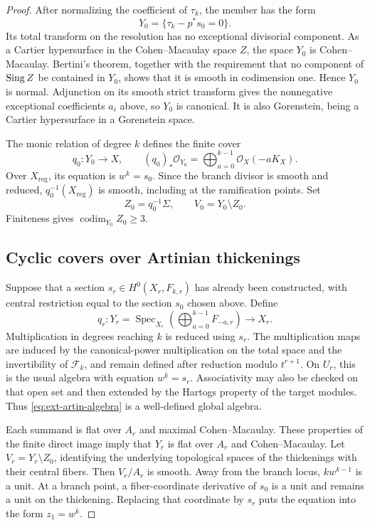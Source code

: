 \documentclass[11pt,a4paper]{article}
\theoremstyle{definition}\newtheorem{definition}[theorem]{Definition}
\theoremstyle{remark}\newtheorem*{remark}{Remark}
\newcommand{\OO}{\mathcal O}
\newcommand{\cF}{\mathcal F}\newcommand{\cX}{\mathcal X}
\newcommand{\Spec}{\operatorname{Spec}}\newcommand{\Proj}{\operatorname{Proj}}
\begin{document}
\begin{proof}
After normalizing the coefficient of $\tau_k$, the member has the form
\begin{equation}\label{eq:ext-central-root}
 Y_0=\{\tau_k-p^*s_0=0\}.
\end{equation}
Its total transform on the resolution has no exceptional divisorial
component. As a Cartier hypersurface in the Cohen--Macaulay space $Z$,
the space $Y_0$ is Cohen--Macaulay. Bertini's theorem, together with the
requirement that no component of $\operatorname{Sing} Z$ be contained in $Y_0$, shows
that it is smooth in codimension one. Hence $Y_0$ is normal.
Adjunction on its smooth strict transform gives the nonnegative
exceptional coefficients $a_i$ above, so $Y_0$ is canonical.
It is also Gorenstein, being a Cartier hypersurface in a Gorenstein space.

The monic relation of degree $k$ defines the finite cover
\begin{equation}\label{eq:ext-central-algebra}
 q_0:Y_0\to X,\qquad
 (q_0)_*\OO_{Y_0}
 =\bigoplus_{a=0}^{k-1}\OO_X(-aK_X).
\end{equation}
Over $X_{\mathrm{reg}}$, its equation is $w^k=s_0$.
Since the branch divisor is smooth and reduced,
$q_0^{-1}(X_{\mathrm{reg}})$ is smooth, including at the ramification
points. Set
\[
 Z_0=q_0^{-1}\Sigma,\qquad V_0=Y_0\setminus Z_0.
\]
Finiteness gives $\operatorname{codim}_{Y_0}Z_0\ge3$.

\subsection{Cyclic covers over Artinian thickenings}

Suppose that a section
$s_r\in H^0(X_r,F_{k,r})$ has already been constructed, with central
restriction equal to the section $s_0$ chosen above. Define
\begin{equation}\label{eq:ext-artin-algebra}
 q_r:Y_r=\Spec_{X_r}
 \left(\bigoplus_{a=0}^{k-1}F_{-a,r}\right)\longrightarrow X_r.
\end{equation}
Multiplication in degrees reaching $k$ is reduced using $s_r$.
The multiplication maps are induced by the canonical-power multiplication
on the total space and the invertibility of $\cF_k$, and remain defined
after reduction modulo $t^{r+1}$. On $U_r$, this is the usual algebra
with equation $w^k=s_r$. Associativity may also be checked on that open
set and then extended by the Hartogs property of the target modules.
Thus \eqref{eq:ext-artin-algebra} is a well-defined global algebra.

Each summand is flat over $A_r$ and maximal Cohen--Macaulay. These
properties of the finite direct image imply that $Y_r$ is flat over
$A_r$ and Cohen--Macaulay.
Let $V_r=Y_r\setminus Z_0$, identifying the underlying topological spaces
of the thickenings with their central fibers.
Then $V_r/A_r$ is smooth. Away from the branch locus, $kw^{k-1}$ is a
unit. At a branch point, a fiber-coordinate derivative of $s_0$ is a
unit and remains a unit on the thickening. Replacing that coordinate by
$s_r$ puts the equation into the form $z_1=w^k$.


\end{proof}
\end{document}
